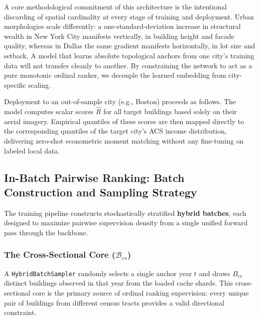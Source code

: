 \documentclass{article}
\begin{document}
A core methodological commitment of this architecture is the intentional discarding of spatial cardinality at every stage of training and deployment. Urban morphologies scale differently: a one-standard-deviation increase in structural wealth in New York City manifests vertically, in building height and facade quality, whereas in Dallas the same gradient manifests horizontally, in lot size and setback. A model that learns absolute topological anchors from one city's training data will not transfer cleanly to another. By constraining the network to act as a pure monotonic ordinal ranker, we decouple the learned embedding from city-specific scaling.

Deployment to an out-of-sample city (e.g., Boston) proceeds as follows. The model computes scalar scores $\hat{R}$ for all target buildings based solely on their aerial imagery. Empirical quantiles of these scores are then mapped directly to the corresponding quantiles of the target city's ACS income distribution, delivering zero-shot econometric moment matching without any fine-tuning on labeled local data.

\subsection{In-Batch Pairwise Ranking: Batch Construction and Sampling Strategy}

The training pipeline constructs stochastically stratified \textbf{hybrid batches}, each designed to maximize pairwise supervision density from a single unified forward pass through the backbone.

\subsubsection{The Cross-Sectional Core ($\mathcal{B}_{cs}$)}
A \texttt{HybridBatchSampler} randomly selects a single anchor year $t$ and draws $B_{cs}$ distinct buildings observed in that year from the loaded cache shards. This cross-sectional core is the primary source of ordinal ranking supervision: every unique pair of buildings from different census tracts provides a valid directional constraint.
\end{document}
